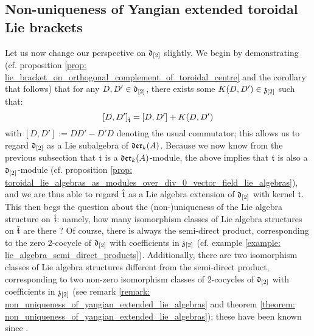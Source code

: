     \subsection{Non-uniqueness of Yangian extended toroidal Lie brackets}
        Let us now change our perspective on $\mathfrak{d}_{[2]}$ slightly. We begin by demonstrating (cf. proposition \ref{prop: lie_bracket_on_orthogonal_complement_of_toroidal_centre} and the corollary that follows) that for any $D, D' \in \mathfrak{d}_{[2]}$, there exists some $K(D, D') \in \mathfrak{z}_{[2]}$ such that:
            $$[D, D']_{\hat{\mathfrak{t}}} = [D, D'] + K(D, D')$$
        with $[D, D'] := DD' - D'D$ denoting the usual commutator; this allows us to regard $\mathfrak{d}_{[2]}$ as a Lie subalgebra of $\mathfrak{der}_k(A)$. Because we now know from the previous subsection that $\mathfrak{t}$ is a $\mathfrak{der}_k(A)$-module, the above implies that $\mathfrak{t}$ is also a $\mathfrak{d}_{[2]}$-module (cf. proposition \ref{prop: toroidal_lie_algebras_as_modules_over_div_0_vector_field_lie_algebras}), and we are thus able to regard $\hat{\mathfrak{t}}$ as a Lie algebra extension of $\mathfrak{d}_{[2]}$ with kernel $\mathfrak{t}$. This then begs the question about the (non-)uniqueness of the Lie algebra structure on $\hat{\mathfrak{t}}$: namely, how many isomorphism classes of Lie algebra structures on $\hat{\mathfrak{t}}$ are there ? Of course, there is always the semi-direct product, corresponding to the zero $2$-cocycle of $\mathfrak{d}_{[2]}$ with coefficients in $\mathfrak{z}_{[2]}$ (cf. example \ref{example: lie_algebra_semi_direct_products}). Additionally, there are two isomorphism classes of Lie algebra structures different from the semi-direct product, corresponding to two non-zero isomorphism classes of $2$-cocycles of $\mathfrak{d}_{[2]}$ with coefficients in $\mathfrak{z}_{[2]}$ (see remark \ref{remark: non_uniqueness_of_yangian_extended_lie_algebras} and theorem \ref{theorem: non_uniqueness_of_yangian_extended_lie_algebras}); these have been known since \cite{billig_energy_momentum_tensor}. 
        
